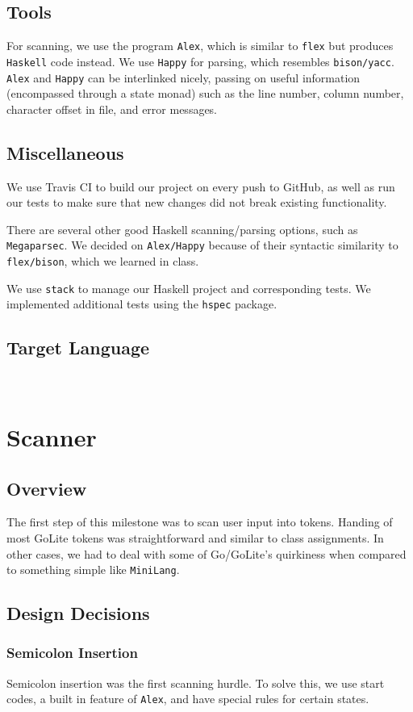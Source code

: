 \documentclass[11pt]{article}
\begin{document}
\subsection{Tools}
For scanning, we use the program \texttt{Alex}, which is similar to \texttt{flex}
but produces \texttt{Haskell} code instead. We use \texttt{Happy} for parsing,
which resembles \texttt{bison/yacc}. \texttt{Alex} and \texttt{Happy} can be interlinked
nicely, passing on useful information (encompassed through a state monad)
such as the line number, column number, character offset in file, and
error messages.
\subsection{Miscellaneous}
We use Travis CI to build our project on every push to GitHub, as well as
run our tests to make sure that new changes did not break
existing functionality.

There are several other good Haskell scanning/parsing options, such as
\texttt{Megaparsec}. We decided on \texttt{Alex/Happy} because of their syntactic
similarity to \texttt{flex/bison}, which we learned in class.

We use \texttt{stack} to manage our Haskell project and corresponding tests.
We implemented additional tests using the \texttt{hspec} package.

\subsection{Target Language}~%
\section{Scanner}
\subsection{Overview}
The first step of this milestone was to scan user input into
tokens. Handing of most GoLite tokens was straightforward and
similar to class assignments. In other cases, we had to deal with
some of Go/GoLite's quirkiness when compared to something simple
like \texttt{MiniLang}.

\subsection{Design Decisions}
\subsubsection{Semicolon Insertion}
Semicolon insertion was the first scanning hurdle. To solve
this, we use start codes, a built in feature of \texttt{Alex}, and have
special rules for certain states.
\end{document}
